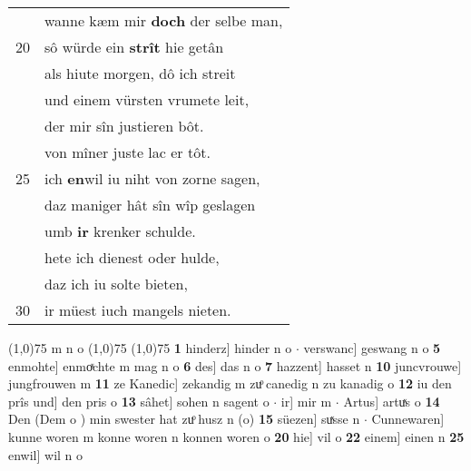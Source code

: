 \documentclass[8pt,a4paper,notitlepage]{article}
\begin{document}
\begin{table}[ht]
\begin{minipage}[t]{0.5\linewidth}
\begin{tabular}{rl}
 & wanne kæm mir \textbf{doch} der selbe man,\\ 
20 & sô würde ein \textbf{strît} hie getân\\ 
 & als hiute morgen, dô ich streit\\ 
 & und einem vürsten vrumete leit,\\ 
 & der mir sîn justieren bôt.\\ 
 & von mîner juste lac er tôt.\\ 
25 & ich \textbf{en}wil iu niht von zorne sagen,\\ 
 & daz maniger hât sîn wîp geslagen\\ 
 & umb \textbf{ir} krenker schulde.\\ 
 & hete ich dienest oder hulde,\\ 
 & daz ich iu solte bieten,\\ 
30 & ir müest iuch mangels nieten.\\ 
\end{tabular}
\scriptsize
\line(1,0){75} \newline
m n o \newline
\line(1,0){75} \newline
\newline
\line(1,0){75} \newline
\textbf{1} hinderz] hinder n o  $\cdot$ verswanc] geswang n o \textbf{5} enmohte] enmoͯchte m mag n o \textbf{6} des] das n o \textbf{7} hazzent] hasset n \textbf{10} juncvrouwe] jungfrouwen m \textbf{11} ze Kanedic] zekandig m zuͦ canedig n zu kanadig o \textbf{12} iu den prîs und] den pris o \textbf{13} sâhet] sohen n sagent o  $\cdot$ ir] mir m  $\cdot$ Artus] artuͯs o \textbf{14} Den (Dem o ) min swester hat zuͦ husz n (o) \textbf{15} süezen] suͯsse n  $\cdot$ Cunnewaren] kunne woren m konne woren n konnen woren o \textbf{20} hie] vil o \textbf{22} einem] einen n \textbf{25} enwil] wil n o \newline
\end{minipage}
\end{table}
\newpage
\end{document}
